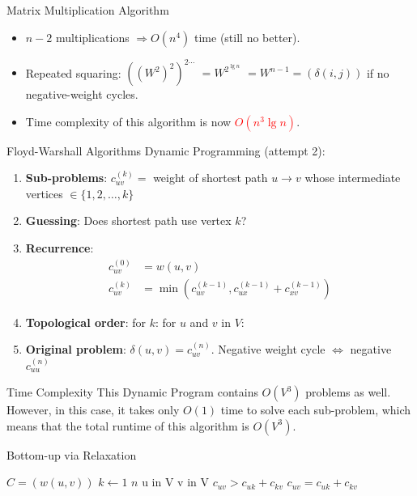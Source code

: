 \documentclass[aspectratio=169]{beamer}
\begin{document}
\begin{frame}{Matrix Multiplication Algorithm}
    \begin{itemize}
        \item $n - 2$ multiplications $\Rightarrow O(n^4)$ time (still no better). \pause
        \item Repeated squaring: $((W^2)^2)^{2 \cdots}$ \pause $= W^{2^{\lg n}}$ \pause $= W^{n - 1} = (\delta(i, j))$ if no negative-weight cycles. \pause
        \item Time complexity of this algorithm is now \textcolor{red}{$O(n^3 \lg n)$}.
    \end{itemize}
\end{frame}

\begin{frame}{Floyd-Warshall Algorithms}
    Dynamic Programming (attempt 2):
    \begin{enumerate}
        \item \textbf{Sub-problems}: $c_{uv}^{(k)} =$ weight of shortest path $u \rightarrow v$ whose intermediate vertices $\in \{1,2, \ldots, k\}$ \pause
        \item \textbf{Guessing}:  \pause Does shortest path use vertex $k$? \pause
        \item \textbf{Recurrence}:
        \begin{equation*}
            \begin{align*}
                c_{uv}^{(0)} &= w(u, v) \\
                c_{uv}^{(k)} &= \min(c_{uv}^{(k-1)}, c_{ux}^{(k-1)} + c_{xv}^{(k-1)})
            \end{align*}
        \end{equation*}  \pause
        \item \textbf{Topological order}: for $k$: for $u$ and $v$ in $V$:
        \item \textbf{Original problem}: $\delta(u, v) = c_{uv}^{(n)}$. Negative weight cycle $\Leftrightarrow$ negative $c_{uu}^{(n)}$
    \end{enumerate}
\end{frame}

\begin{frame}{Time Complexity}
    This Dynamic Program contains $O(V^3)$ problems as well. However, in this case, it takes only $O(1)$ time to solve each sub-problem, which means that the total runtime of this algorithm is $O(V^3)$.
\end{frame}

\begin{frame}{Bottom-up via Relaxation}
    \begin{codebox}
        \li $C = (w(u, v))$
        \li \For $k \gets 1$ \To $n$
        \li \hspace{0.5cm} \For u in V
        \li \hspace{1.0cm} \For v in V
        \li \hspace{1.5cm} \If $c_{uv} > c_{uk} + c_{kv}$
        \li \hspace{2.0cm} $c_{uv} = c_{uk} + c_{kv}$
    \end{codebox}
\end{frame}
\end{document}
